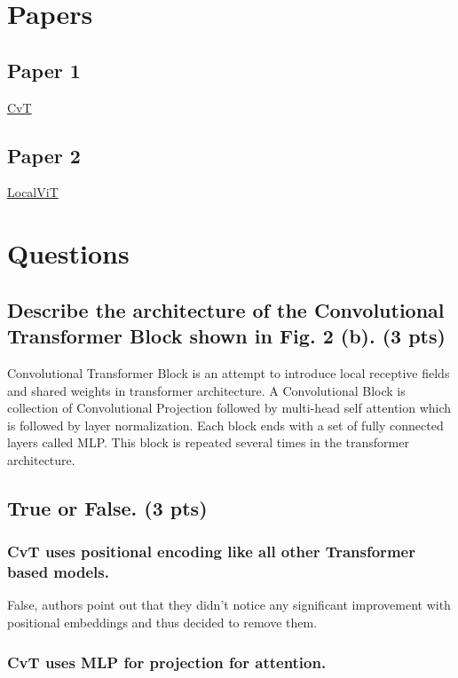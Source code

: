 \documentclass{article}
\title{\mathbf{Discussion Quiz \#9}}
\author{{Ashutosh Tiwari (ashutiwa@iu.edu)}}
\begin{document}
\maketitle

\section{Papers}
\subsection{Paper 1}
    \href{https://arxiv.org/pdf/2103.15808.pdf}{CvT}
\subsection{Paper 2}
    \href{https://arxiv.org/pdf/2104.05707.pdf}{LocalViT}

\section{Questions}

\subsection{Describe the architecture of the Convolutional Transformer Block shown in Fig. 2 (b). (3 pts)}

Convolutional Transformer Block is an attempt to introduce local receptive fields and shared weights in transformer architecture. A Convolutional Block is collection of Convolutional Projection followed by multi-head self attention which is followed by layer normalization. Each block ends with a set of fully connected layers called MLP. This block is repeated several times in the transformer architecture.

\subsection{True or False. (3 pts)}
\subsubsection{CvT uses positional encoding like all other Transformer based models.}

False, authors point out that they didn't notice any significant improvement with positional embeddings and thus decided to remove them.

\subsubsection{CvT uses MLP for projection for attention.}
\end{document}
